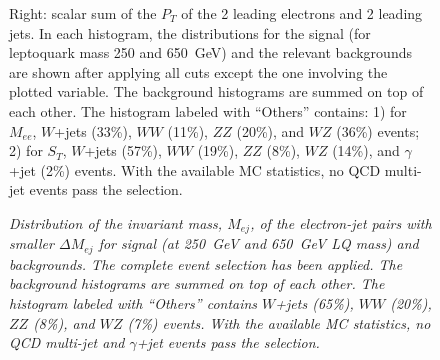 \documentclass{cmspaper}
\begin{document}
\begin{linenumbers}
\begin{figure}[htbp]
\begin{center}
{             Right: scalar sum of the $P_T$ of the 2 leading electrons and 2 leading jets. 
	     In each histogram, the distributions for the signal (for leptoquark mass 250 and 650~GeV) and the 
	     relevant backgrounds are shown after applying all cuts except the one involving the 
	     plotted variable. 
	     The background histograms are summed on top of each other.
	     The histogram labeled with ``Others'' contains: 1) for $M_{ee}$, $W$+jets (33\%), 
	     $WW$ (11\%), $ZZ$ (20\%), and $WZ$ (36\%) events; 2) for $S_{T}$, $W$+jets (57\%), 
	     $WW$ (19\%), $ZZ$ (8\%), $WZ$ (14\%), and $\gamma$+jet (2\%) events.
	     With the available MC statistics, no QCD multi-jet events pass 
	     the selection.}
    \label{fig:Mee_St_distributions}
  \end{center}
\end{figure}


\begin{figure}[htbp]
  \begin{center}
    \caption{\small \sl Distribution of the invariant mass, $M_{ej}$, of the electron-jet pairs 
      with smaller $\Delta M_{ej}$
      for signal (at 250~GeV and 650~GeV LQ mass) and backgrounds. 
      The complete event selection has been applied.
      The background histograms are summed on top of each other.
      The histogram labeled with ``Others'' contains $W$+jets (65\%), 
      $WW$ (20\%), $ZZ$ (8\%), and $WZ$ (7\%) events. 
      With the available MC statistics, no QCD multi-jet and $\gamma$+jet events pass 
      the selection.}
    \label{fig:Mej_allComb}
  \end{center}
\end{figure}


\end{linenumbers}
\end{document}
